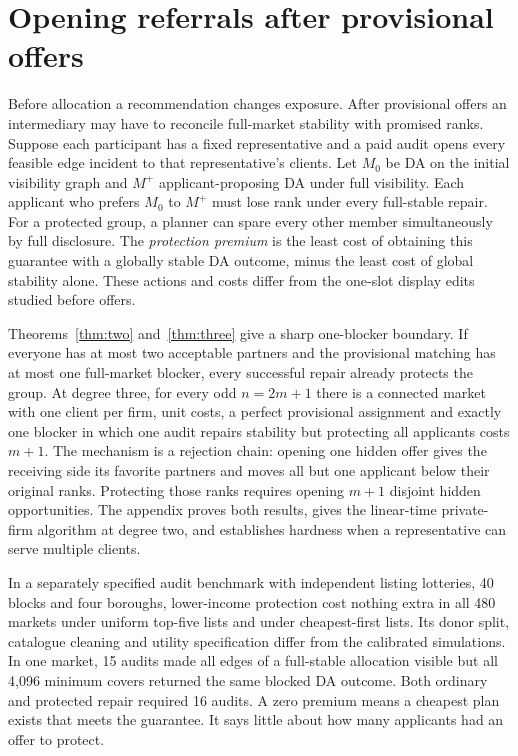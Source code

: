 \section{Opening referrals after provisional offers}
Before allocation a recommendation changes exposure. After provisional offers an intermediary may have to reconcile full-market stability with promised ranks. Suppose each participant has a fixed representative and a paid audit opens every feasible edge incident to that representative's clients. Let $M_0$ be DA on the initial visibility graph and $M^+$ applicant-proposing DA under full visibility. Each applicant who prefers $M_0$ to $M^+$ must lose rank under every full-stable repair. For a protected group, a planner can spare every other member simultaneously by full disclosure. The \emph{protection premium} is the least cost of obtaining this guarantee with a globally stable DA outcome, minus the least cost of global stability alone. These actions and costs differ from the one-slot display edits studied before offers.

Theorems~\ref{thm:two} and~\ref{thm:three} give a sharp one-blocker boundary. If everyone has at most two acceptable partners and the provisional matching has at most one full-market blocker, every successful repair already protects the group. At degree three, for every odd $n=2m+1$ there is a connected market with one client per firm, unit costs, a perfect provisional assignment and exactly one blocker in which one audit repairs stability but protecting all applicants costs $m+1$. The mechanism is a rejection chain: opening one hidden offer gives the receiving side its favorite partners and moves all but one applicant below their original ranks. Protecting those ranks requires opening $m+1$ disjoint hidden opportunities. The appendix proves both results, gives the linear-time private-firm algorithm at degree two, and establishes hardness when a representative can serve multiple clients.

In a separately specified audit benchmark with independent listing lotteries, 40 blocks and four boroughs, lower-income protection cost nothing extra in all 480 markets under uniform top-five lists and under cheapest-first lists. Its donor split, catalogue cleaning and utility specification differ from the calibrated simulations. In one market, 15 audits made all edges of a full-stable allocation visible but all 4,096 minimum covers returned the same blocked DA outcome. Both ordinary and protected repair required 16 audits. A zero premium means a cheapest plan exists that meets the guarantee. It says little about how many applicants had an offer to protect.
